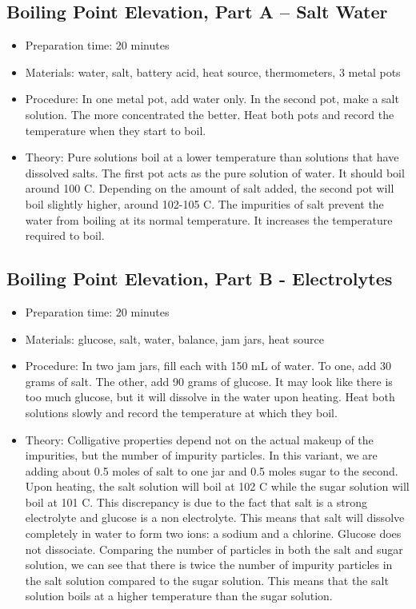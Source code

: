 \subsection{Boiling Point Elevation, Part A – Salt Water}
\begin{itemize}
\item{Preparation time: 20 minutes}
\item{Materials: water, salt, battery acid, heat source, thermometers, 3 metal pots}
\item{Procedure: In one metal pot, add water only. In the second pot, make a salt solution. The more concentrated the better. Heat both pots and record the temperature when they start to boil. }
\item{Theory: Pure solutions boil at a lower temperature than solutions that have dissolved salts. The first pot acts as the pure solution of water. It should boil around 100 C. Depending on the amount of salt added, the second pot will boil slightly higher, around 102-105 C. The impurities of salt prevent the water from boiling at its normal temperature. It increases the temperature required to boil. }
\end{itemize}

\subsection{Boiling Point Elevation, Part B - Electrolytes}
\begin{itemize}
\item{Preparation time: 20 minutes}
\item{Materials: glucose, salt, water, balance, jam jars, heat source}
\item{Procedure: In two jam jars, fill each with 150 mL of water. To one, add 30 grams of salt. The other, add 90 grams of glucose. It may look like there is too much glucose, but it will dissolve in the water upon heating. Heat both solutions slowly and record the temperature at which they boil.}
\item{Theory: Colligative properties depend not on the actual makeup of the impurities, but the number of impurity particles. In this variant, we are adding about 0.5 moles of salt to one jar and 0.5 moles sugar to the second. Upon heating, the salt solution will boil at 102 C while the sugar solution will boil at 101 C. This discrepancy is due to the fact that salt is a strong electrolyte and glucose is a non electrolyte. This means that salt will dissolve completely in water to form two ions: a sodium and a chlorine. Glucose does not dissociate. Comparing the number of particles in both the salt and sugar solution, we can see that there is twice the number of impurity particles in the salt solution compared to the sugar solution. This means that the salt solution boils at a higher temperature than the sugar solution.}
\end{itemize}


